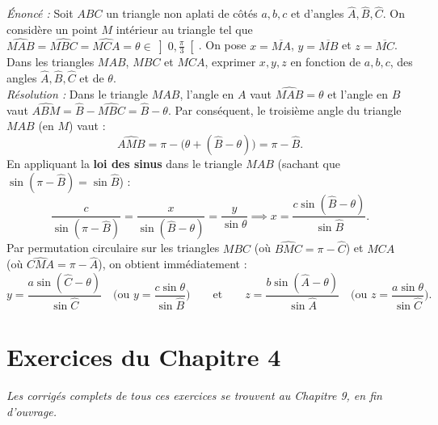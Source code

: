 \begin{exemple}
\emph{Énoncé :} Soit $ABC$ un triangle non aplati de côtés $a, b, c$ et d'angles $\widehat{A}, \widehat{B}, \widehat{C}$. On considère un point $M$ intérieur au triangle tel que $\widehat{MAB} = \widehat{MBC} = \widehat{MCA} = \theta \in \left]0, \frac{\pi}{3}\right[$. On pose $x = \overline{MA}$, $y = \overline{MB}$ et $z = \overline{MC}$. Dans les triangles $MAB$, $MBC$ et $MCA$, exprimer $x, y, z$ en fonction de $a, b, c$, des angles $\widehat{A}, \widehat{B}, \widehat{C}$ et de $\theta$.\\
\emph{Résolution :} Dans le triangle $MAB$, l'angle en $A$ vaut $\widehat{MAB} = \theta$ et l'angle en $B$ vaut $\widehat{ABM} = \widehat{B} - \widehat{MBC} = \widehat{B} - \theta$. Par conséquent, le troisième angle du triangle $MAB$ (en $M$) vaut :
\[
    \widehat{AMB} = \pi - \bigl(\theta + (\widehat{B} - \theta)\bigr) = \pi - \widehat{B}.
\]
En appliquant la \textbf{loi des sinus} dans le triangle $MAB$ (sachant que $\sin(\pi - \widehat{B}) = \sin\widehat{B}$) :
\[
    \frac{c}{\sin(\pi - \widehat{B})} = \frac{x}{\sin(\widehat{B} - \theta)} = \frac{y}{\sin\theta} \implies \boxed{x = \frac{c\sin(\widehat{B} - \theta)}{\sin\widehat{B}}}.
\]
Par permutation circulaire sur les triangles $MBC$ (où $\widehat{BMC} = \pi - \widehat{C}$) et $MCA$ (où $\widehat{CMA} = \pi - \widehat{A}$), on obtient immédiatement :
\[
    \boxed{y = \frac{a\sin(\widehat{C} - \theta)}{\sin\widehat{C}} \quad \text{(ou } y = \frac{c\sin\theta}{\sin\widehat{B}}\text{)} \qquad \text{et} \qquad z = \frac{b\sin(\widehat{A} - \theta)}{\sin\widehat{A}} \quad \text{(ou } z = \frac{a\sin\theta}{\sin\widehat{C}}\text{)}}.
\]
\end{exemple}

\section{Exercices du Chapitre 4}

\emph{Les corrigés complets de tous ces exercices se trouvent au Chapitre 9, en fin d'ouvrage.}

